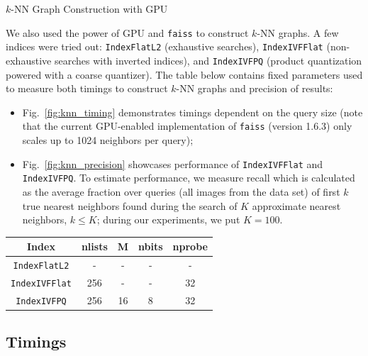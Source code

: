 \begin{frame}

\begin{block}{$k$-NN Graph Construction with GPU}

	We also used the power of GPU and \texttt{faiss} to construct $k$-NN graphs. A few indices were tried out: \texttt{IndexFlatL2} (exhaustive searches), \texttt{IndexIVFFlat} (non-exhaustive searches with inverted indices), and \texttt{IndexIVFPQ} (product quantization powered with a coarse quantizer). The table below contains fixed parameters used to measure both timings to construct $k$-NN graphs and precision of results:

\begin{itemize}
	\item Fig.~\ref{fig:knn_timing} demonstrates timings dependent on the query size (note that the current GPU-enabled implementation of \texttt{faiss} (version 1.6.3) only scales up to 1024 neighbors per query);
	\item Fig.~\ref{fig:knn_precision} showcases performance of \texttt{IndexIVFFlat} and \texttt{IndexIVFPQ}. To estimate performance, we measure recall which is calculated as the average fraction over queries (all images from the data set) of first $k$ true nearest neighbors found during the search of $K$ approximate nearest neighbors, $k \leq K$; during our experiments, we put $K = 100$.
\end{itemize}
	
\end{block}

	\begin{table}
		\small
		\begin{tabular}{| c || c | c | c | c |}
			\hline
			Index & nlists & M & nbits & nprobe \\
			\hline
			\hline			
			\texttt{IndexFlatL2} & - & - & - & - \\
			\hline
			\texttt{IndexIVFFlat} & 256 & - & - & 32 \\
			\hline
			\texttt{IndexIVFPQ} & 256 & 16 & 8 & 32 \\
			\hline  
		\end{tabular}
	\end{table}

\end{frame}


\subsection{Timings}


